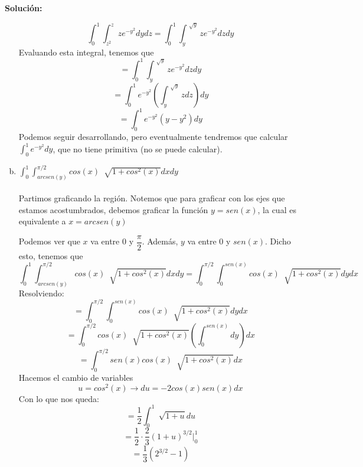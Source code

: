 \documentclass[12pt]{article}
\newenvironment{solucion}
{\begin{mdframed}[backgroundcolor=black!10]
		{\bf Solución:}\\
	}
	{
	\end{mdframed}
}
\newenvironment{preguntas}
{\begin{enumerate}\itemsep12pt
	}
	{
	\end{enumerate}
}
\newcommand{\ev}{\Big|}
\newcommand{\ra}{\rightarrow}
\begin{document}
\begin{preguntas}
\begin{solucion}
\begin{enumerate}[a)]
			$$\displaystyle\int_0^1 \displaystyle\int_{z^2}^z ze^{-y^2} dydz = 
			\displaystyle\int_0^1 \displaystyle\int_{y}^{\sqrt[]{y}} ze^{-y^2} dzdy$$
			Evaluando esta integral, tenemos que
			$$= \displaystyle\int_0^1 \displaystyle\int_{y}^{\sqrt[]{y}} ze^{-y^2} dzdy$$
			$$= \displaystyle\int_0^1 e^{-y^2} \left(\displaystyle\int_{y}^{\sqrt[]{y}} z dz \right) dy$$
			$$= \displaystyle\int_0^1 e^{-y^2} (y-y^2) dy$$
			Podemos seguir desarrollando, pero eventualmente tendremos que calcular $\displaystyle\int_0^1 e^{-y^2}dy$, que no tiene primitiva (no se puede calcular).
\item $\displaystyle\int_0^1 \displaystyle\int_{arcsen(y)}^{\pi/2} cos(x)\ \sqrt[]{1+cos^2(x)} dxdy$\\
			\\
			Partimos graficando la región. Notemos que para graficar con los ejes que estamos acostumbrados, debemos graficar la función $y=sen(x)$, la cual es equivalente a $x = arcsen(y)$
			\begin{center}
			\end{center}		
			Podemos ver que $x$ va entre $0$ y $\dfrac{\pi}{2}$. Además, $y$ va entre $0$ y $sen(x)$. Dicho esto, tenemos que
			$$\displaystyle\int_0^1 \displaystyle\int_{arcsen(y)}^{\pi/2} cos(x)\ \sqrt[]{1+cos^2(x)} dxdy=
			\displaystyle\int_0^{\pi/2} \displaystyle\int_0^{sen(x)} cos(x)\ \sqrt[]{1+cos^2(x)} dydx$$
			Resolviendo:
			$$=\displaystyle\int_0^{\pi/2} \displaystyle\int_0^{sen(x)} cos(x)\ \sqrt[]{1+cos^2(x)} dydx$$
			$$=\displaystyle\int_0^{\pi/2} cos(x)\ \sqrt[]{1+cos^2(x)} \left( \displaystyle\int_0^{sen(x)} dy \right) dx$$
			$$=\displaystyle\int_0^{\pi/2} sen(x) cos(x)\ \sqrt[]{1+cos^2(x)} dx$$
			Hacemos el cambio de variables
			$$ u = cos^2(x) \ra du = -2cos(x)sen(x)dx $$
			Con lo que nos queda:
			$$=\dfrac{1}{2}\displaystyle\int_0^1 \sqrt[]{1+u} du$$
			$$=\dfrac{1}{2} \cdot \dfrac{2}{3}(1+u)^{3/2} \ev_0^1$$
			$$=\dfrac{1}{3} (2^{3/2}-1)$$

\end{enumerate}
\end{solucion}
\end{preguntas}
\end{document}
